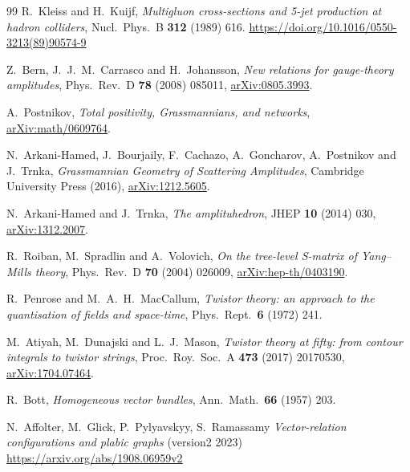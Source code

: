 \documentclass[11pt,a4paper]{article}
\theoremstyle{definition}
\begin{document}
\begin{thebibliography}{99}
R.~Kleiss and H.~Kuijf,
\emph{Multigluon cross-sections and 5-jet production at hadron colliders},
Nucl.\ Phys.\ B \textbf{312} (1989) 616. \url{https://doi.org/10.1016/0550-3213(89)90574-9}

Z.~Bern, J.~J.~M.~Carrasco and H.~Johansson,
\emph{New relations for gauge-theory amplitudes},
Phys.\ Rev.\ D \textbf{78} (2008) 085011,
\href{https://arxiv.org/abs/0805.3993}{arXiv:0805.3993}.

A.~Postnikov,
\emph{Total positivity, Grassmannians, and networks},
\href{https://arxiv.org/abs/math/0609764}{arXiv:math/0609764}.

N.~Arkani-Hamed, J.~Bourjaily, F.~Cachazo, A.~Goncharov, A.~Postnikov and
J.~Trnka,
\emph{Grassmannian Geometry of Scattering Amplitudes},
Cambridge University Press (2016),
\href{https://arxiv.org/abs/1212.5605}{arXiv:1212.5605}.

N.~Arkani-Hamed and J.~Trnka,
\emph{The amplituhedron},
JHEP \textbf{10} (2014) 030,
\href{https://arxiv.org/abs/1312.2007}{arXiv:1312.2007}.

R.~Roiban, M.~Spradlin and A.~Volovich,
\emph{On the tree-level S-matrix of Yang--Mills theory},
Phys.\ Rev.\ D \textbf{70} (2004) 026009,
\href{https://arxiv.org/abs/hep-th/0403190}{arXiv:hep-th/0403190}.




R.~Penrose and M.~A.~H.~MacCallum,
\emph{Twistor theory: an approach to the quantisation of fields and space-time},
Phys.\ Rept.\ \textbf{6} (1972) 241.

M.~Atiyah, M.~Dunajski and L.~J.~Mason,
\emph{Twistor theory at fifty: from contour integrals to twistor strings},
Proc.\ Roy.\ Soc.\ A \textbf{473} (2017) 20170530,
\href{https://arxiv.org/abs/1704.07464}{arXiv:1704.07464}.


R.~Bott,
\emph{Homogeneous vector bundles},
Ann.\ Math.\ \textbf{66} (1957) 203.

N.~Affolter, M.~Glick, P.~Pylyavskyy, S.~Ramassamy
\emph{Vector-relation configurations and plabic graphs} (version2 2023)
\url{https://arxiv.org/abs/1908.06959v2}

\end{thebibliography}
\end{document}
